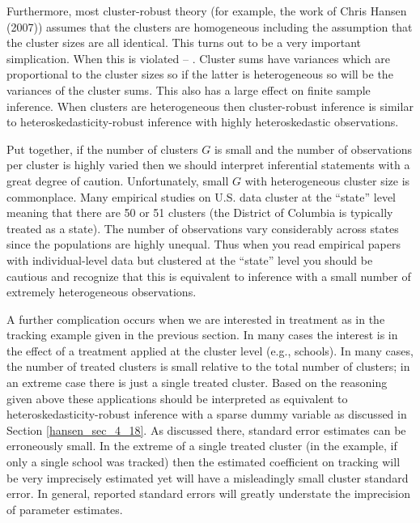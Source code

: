 Furthermore, most cluster-robust theory (for example, the work of Chris Hansen (2007)) assumes that the clusters are homogeneous including the assumption that the cluster sizes are all identical. This turns out to be a very important simplication. When this is violated -- .  Cluster sums have variances which are proportional to the cluster sizes so if the latter is heterogeneous so will be the variances of the cluster sums. This also has a large effect on finite sample inference. When clusters are heterogeneous then cluster-robust inference is similar to heteroskedasticity-robust inference with highly heteroskedastic observations.

Put together, if the number of clusters $G$ is small and the number of observations per cluster is highly varied then we should interpret inferential statements with a great degree of caution. Unfortunately, small $G$ with heterogeneous cluster size is commonplace.  Many empirical studies on U.S. data cluster at the ``state'' level meaning that there are 50 or 51 clusters (the District of Columbia is typically treated as a state). The number of observations vary considerably across states since the populations are highly unequal. Thus when you read empirical papers with individual-level data but clustered at the ``state'' level you should be cautious and recognize that this is equivalent to inference with a small number of extremely heterogeneous observations.

A further complication occurs when we are interested in treatment as in the tracking example given in the previous section. In many cases the interest is in the effect of a treatment applied at the cluster level (e.g., schools). In many cases, the number of treated clusters is small relative to the total number of clusters; in an extreme case there is just a single treated cluster. Based on the reasoning given above these applications should be interpreted as equivalent to heteroskedasticity-robust inference with a sparse dummy variable as discussed in Section \ref{hansen_sec_4_18}. As discussed there, standard error estimates can be erroneously small. In the extreme of a single treated cluster (in the example, if only a single school was tracked) then the estimated coefficient on tracking will be very imprecisely estimated yet will have a misleadingly small cluster standard error. In general, reported standard errors will greatly understate the imprecision of parameter estimates.

